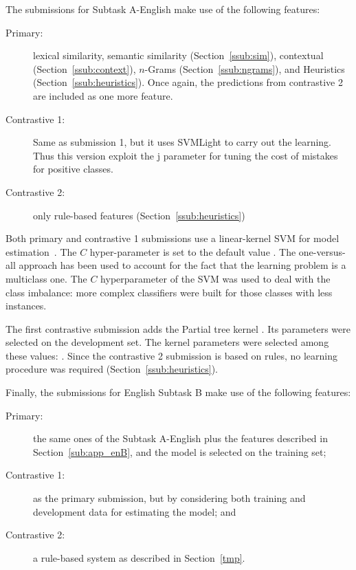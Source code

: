 The submissions for Subtask A-English make use of the following features: 
\begin{description}
\item[Primary:] 
  lexical similarity, semantic similarity (Section~\ref{ssub:sim}), contextual 
  (Section~\ref{ssub:context}), $n$-Grams (Section~\ref{ssub:ngrams}), and
  Heuristics (Section~\ref{ssub:heuristics}). Once again, the predictions from 
  contrastive 2 are included as one more feature. 
\item[Contrastive 1:] 
  Same as submission 1, but it uses SVMLight to carry out the learning. Thus 
  this version exploit the j parameter for tuning the cost of mistakes for 
  positive classes.
    
\item[Contrastive 2:] 
  only rule-based features 
(Section~\ref{ssub:heuristics}) 
\end{description}
% 
Both primary and contrastive 1 submissions use a linear-kernel SVM for model 
estimation~\cite{}. The $C$ hyper-parameter is set to the default value 
. The one-versus-all approach has been used to account for the fact 
that the learning problem is a multiclass one. The $C$ hyperparameter of the SVM 
was used to deal with the class imbalance: more complex classifiers were 
built for those classes with less instances.

The first contrastive submission adds the Partial tree kernel . Its parameters 
were selected on the development set. The kernel parameters were selected among 
these values: . 
Since the contrastive 2 submission is based on rules, no learning procedure was 
required (Section~\ref{ssub:heuristics}).


Finally, the submissions for English Subtask B make use of the following 
features:
\begin{description}
 \item[Primary:] the same ones of the Subtask A-English plus the features 
described in Section~\ref{sub:app_enB}, and the model is selected on the 
training set; 
 \item[Contrastive 1:] as the primary submission, but by considering both 
training and development data for estimating the model; and
 \item[Contrastive 2:] a rule-based system as described in 
Section~\ref{tmp}.
 \end{description}

